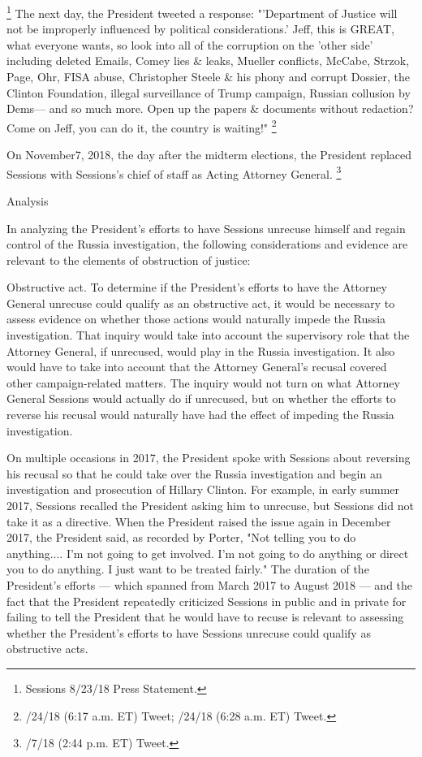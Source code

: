 {\footnote{Sessions 8/23/18 Press Statement.}
The next day, the President tweeted a response: "'Department of Justice will not be improperly influenced by political considerations.'
Jeff, this is GREAT, what everyone wants, so look into all of the corruption on the 'other side' including deleted Emails, Comey lies \& leaks, Mueller conflicts, McCabe, Strzok, Page, Ohr, FISA abuse, Christopher Steele \& his phony and corrupt Dossier, the Clinton Foundation, illegal surveillance of Trump campaign, Russian collusion by Dems— and so much more.
Open up the papers \& documents without redaction? Come on Jeff, you can do it, the country is waiting!"%
\footnote{/24/18 (6:17 a.m. ET) Tweet;
/24/18 (6:28 a.m. ET) Tweet.}

On November7, 2018, the day after the midterm elections, the President replaced Sessions with Sessions's chief of staff as Acting Attorney General.%
\footnote{/7/18 (2:44 p.m. ET) Tweet.}

Analysis

In analyzing the President's efforts to have Sessions unrecuse himself and regain control of the Russia investigation, the following considerations and evidence are relevant to the elements of obstruction of justice:

Obstructive act.
To determine if the President's efforts to have the Attorney General unrecuse could qualify as an obstructive act, it would be necessary to assess evidence on whether those actions would naturally impede the Russia investigation.
That inquiry would take into account the supervisory role that the Attorney General, if unrecused, would play in the Russia investigation.
It also would have to take into account that the Attorney General's recusal covered other campaign-related matters.
The inquiry would not turn on what Attorney General Sessions would actually do if unrecused, but on whether the efforts to reverse his recusal would naturally have had the effect of impeding the Russia investigation.

On multiple occasions in 2017, the President spoke with Sessions about reversing his recusal so that he could take over the Russia investigation and begin an investigation and prosecution of Hillary Clinton.
For example, in early summer 2017, Sessions recalled the President asking him to unrecuse, but Sessions did not take it as a directive.
When the President raised the issue again in December 2017, the President said, as recorded by Porter, "Not telling you to do anything....
I'm not going to get involved.
I'm not going to do anything or direct you to do anything.
I just want to be treated fairly."
The duration of the President's efforts — which spanned from March 2017 to August 2018 — and the fact that the President repeatedly criticized Sessions in public and in private for failing to tell the President that he would have to recuse is relevant to assessing whether the President's efforts to have Sessions unrecuse could qualify as obstructive acts.

}
